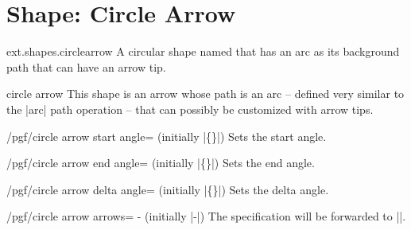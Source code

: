 %
%
%
\section{Shape: Circle Arrow}
\begin{pgflibrary}{ext.shapes.circlearrow}
  A circular shape named that has an arc as its background path that can have an arrow tip.
\end{pgflibrary}
\begin{shape}{circle arrow}
  This shape is an arrow whose path is an arc -- defined very similar to the |arc|%
   path operation -- that can possibly be customized with
  arrow tips.
  
  \begin{key}{/pgf/circle arrow start angle= (initially |\{\}|)}
  Sets the start angle.
  \end{key}
  \begin{key}{/pgf/circle arrow end angle= (initially |\{\}|)}
  Sets the end angle.
  \end{key}
  \begin{key}{/pgf/circle arrow delta angle= (initially |\{\}|)}
  Sets the delta angle.
  \end{key}
  \begin{key}{/pgf/circle arrow arrows=%
    - (initially |-|)}
  The specification will be forwarded to |\pgfsetarrows|\indexCommandO{\pgfsetarrows}.
  \end{key}
  

\end{shape}
